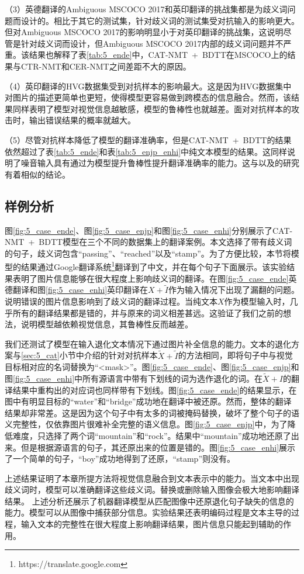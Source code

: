 （3）英德翻译的Ambiguous MSCOCO 2017和英印翻译的挑战集都是为歧义词问题而设计的。相比于其它的测试集，针对歧义词的测试集受对抗输入的影响更大。但对Ambiguous MSCOCO 2017的影响明显小于对英印翻译的挑战集，这说明尽管是针对歧义词而设计，但Ambiguous MSCOCO 2017内部的歧义词问题并不严重。该结果也解释了表\ref{tab:5_ende}中，CAT-NMT~+~BDTT在MSCOCO上的结果与CTR-NMT和CER-NMT之间差距不大的原因。

（4）英印翻译的HVG数据集受到对抗样本的影响最大。这是因为HVG数据集中对图片的描述更简单也更短，使得模型更容易做到跨模态的信息融合。然而，该结果同样表明了模型对视觉信息越敏感，模型的鲁棒性也就越差。面对对抗样本的攻击时，输出错误结果的概率就越大。

（5）尽管对抗样本降低了模型的翻译准确率，但是CAT-NMT~+~BDTT的结果依然超过了表\ref{tab:5_ende}和表\ref{tab:5_enjp_enhi}中纯文本模型的结果。这同样说明了噪音输入具有通过为模型提升鲁棒性提升翻译准确率的能力。这与以及的研究有着相似的结论。


\subsection{样例分析}
图\ref{fig:5_case_ende}、图\ref{fig:5_case_enjp}和图\ref{fig:5_case_enhi}分别展示了CAT-NMT~+~BDTT模型在三个不同的数据集上的翻译案例。本文选择了带有歧义词的句子，歧义词包含“passing”、“reached”以及“stamp”。为了方便比较，本节将模型的结果通过Google翻译系统\footnote{https://translate.google.com}翻译到了中文，并在每个句子下面展示。该实验结果表明了图片信息能够在很大程度上影响歧义词的翻译。在图\ref{fig:5_case_ende}英德翻译和图\ref{fig:5_case_enhi}英印翻译在$X+\tilde{I}$作为输入情况下出现了漏翻的问题。说明错误的图片信息影响到了歧义词的翻译过程。当纯文本$X$作为模型输入时，几乎所有的翻译结果都是错的，并与原来的词义相差甚远。这验证了我们之前的想法，说明模型越依赖视觉信息，其鲁棒性反而越差。




我们还测试了模型在输入退化文本情况下通过图片补全信息的能力。文本的退化方案与\ref{sec:5_cat}小节中介绍的针对对抗样本$\tilde{X}+\tilde{I}$的方法相同，即将句子中与视觉目标相对应的名词替换为“<mask>”。图\ref{fig:5_case_ende}、图\ref{fig:5_case_enjp}和图\ref{fig:5_case_enhi}中所有源语言中带有下划线的词为选作退化的词。在$\tilde{X}+I$的翻译结果中重构出的对应词也同样带有下划线。图\ref{fig:5_case_ende}的结果显示，在图中有明显目标的“water”和“bridge”成功地在翻译中被还原。然而，整体的翻译结果却非常差。这是因为这个句子中有太多的词被掩码替换，破坏了整个句子的语义完整性，仅依靠图片很难补全完整的语义信息。图\ref{fig:5_case_enjp}中，为了降低难度，只选择了两个词“mountain”和“rock”。结果中“mountain”成功地还原了出来。但是根据源语言的句子，其还原出来的位置是错的。图\ref{fig:5_case_enhi}展示了一个简单的句子，“boy”成功地得到了还原，“stamp”则没有。

上述结果证明了本章所提方法将视觉信息融合到文本表示中的能力。当文本中出现歧义词时，模型可以准确翻译这些歧义词。替换或删除输入图像会极大地影响翻译结果。
上述分析还展示了机器翻译模型从匹配图像中还原退化句子缺失的信息的能力。模型可以从图像中捕获部分信息。实验结果还表明编码过程是文本主导的过程，输入文本的完整性在很大程度上影响翻译结果，图片信息只能起到辅助的作用。